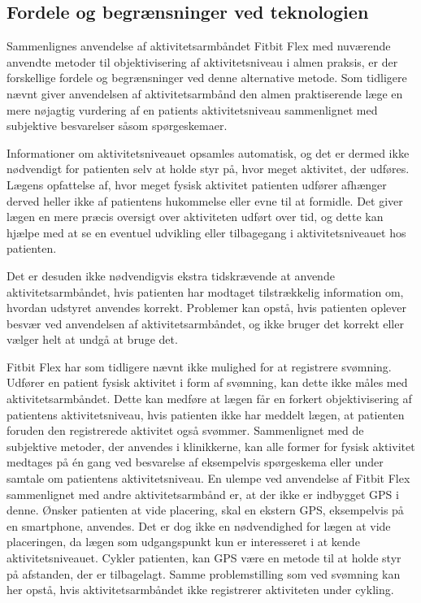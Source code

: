 \subsection{Fordele og begrænsninger ved teknologien}
Sammenlignes anvendelse af aktivitetsarmbåndet Fitbit Flex med nuværende anvendte metoder til objektivisering af aktivitetsniveau i almen praksis, er der forskellige fordele og begrænsninger ved denne alternative metode. Som tidligere nævnt giver anvendelsen af aktivitetsarmbånd den almen praktiserende læge en mere nøjagtig vurdering af en patients aktivitetsniveau sammenlignet med subjektive besvarelser såsom spørgeskemaer.

Informationer om aktivitetsniveauet opsamles automatisk, og det er dermed ikke nødvendigt for patienten selv at holde styr på, hvor meget aktivitet, der udføres. Lægens opfattelse af, hvor meget fysisk aktivitet patienten udfører afhænger derved heller ikke af patientens hukommelse eller evne til at formidle. Det giver lægen en mere præcis oversigt over aktiviteten udført over tid, og dette kan hjælpe med at se en eventuel udvikling eller tilbagegang i aktivitetsniveauet hos patienten. 

Det er desuden ikke nødvendigvis ekstra tidskrævende at anvende aktivitetsarmbåndet, hvis patienten har modtaget tilstrækkelig information om, hvordan udstyret anvendes korrekt. Problemer kan opstå, hvis patienten oplever besvær ved anvendelsen af aktivitetsarmbåndet, og ikke bruger det korrekt eller vælger helt at undgå at bruge det.

Fitbit Flex har som tidligere nævnt ikke mulighed for at registrere svømning. Udfører en patient fysisk aktivitet i form af svømning, kan dette ikke måles med aktivitetsarmbåndet. Dette kan medføre at lægen får en forkert objektivisering af patientens aktivitetsniveau, hvis patienten ikke har meddelt lægen, at patienten foruden den registrerede aktivitet også svømmer. Sammenlignet med de subjektive metoder, der anvendes i klinikkerne, kan alle former for fysisk aktivitet medtages på én gang ved besvarelse af eksempelvis spørgeskema eller under samtale om patientens aktivitetsniveau.
En ulempe ved anvendelse af Fitbit Flex sammenlignet med andre aktivitetsarmbånd er, at der ikke er indbygget GPS i denne. Ønsker patienten at vide placering, skal en ekstern GPS, eksempelvis på en smartphone, anvendes. Det er dog ikke en nødvendighed for lægen at vide placeringen, da lægen som udgangspunkt kun er interesseret i at kende aktivitetsniveauet. Cykler patienten, kan GPS være en metode til at holde styr på afstanden, der er tilbagelagt. Samme problemstilling som ved svømning kan her opstå, hvis aktivitetsarmbåndet ikke registrerer aktiviteten under cykling.
 
